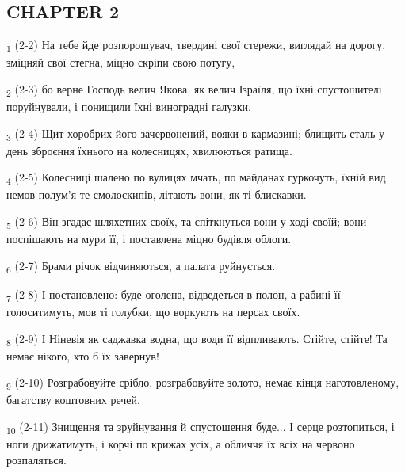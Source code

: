 \subsection{CHAPTER 2}
\begin{tcolorbox}
\textsubscript{1} (2-2) На тебе йде розпорошувач, твердині свої стережи, виглядай на дорогу, зміцняй свої стегна, міцно скріпи свою потугу,
\end{tcolorbox}
\begin{tcolorbox}
\textsubscript{2} (2-3) бо верне Господь велич Якова, як велич Ізраїля, що їхні спустошителі поруйнували, і понищили їхні виноградні галузки.
\end{tcolorbox}
\begin{tcolorbox}
\textsubscript{3} (2-4) Щит хоробрих його зачервонений, вояки в кармазині; блищить сталь у день зброєння їхнього на колесницях, хвилюються ратища.
\end{tcolorbox}
\begin{tcolorbox}
\textsubscript{4} (2-5) Колесниці шалено по вулицях мчать, по майданах гуркочуть, їхній вид немов полум'я те смолоскипів, літають вони, як ті блискавки.
\end{tcolorbox}
\begin{tcolorbox}
\textsubscript{5} (2-6) Він згадає шляхетних своїх, та спіткнуться вони у ході своїй; вони поспішають на мури її, і поставлена міцно будівля облоги.
\end{tcolorbox}
\begin{tcolorbox}
\textsubscript{6} (2-7) Брами річок відчиняються, а палата руйнується.
\end{tcolorbox}
\begin{tcolorbox}
\textsubscript{7} (2-8) І постановлено: буде оголена, відведеться в полон, а рабині її голоситимуть, мов ті голубки, що воркують на персах своїх.
\end{tcolorbox}
\begin{tcolorbox}
\textsubscript{8} (2-9) І Ніневія як саджавка водна, що води її відпливають. Стійте, стійте! Та немає нікого, хто б їх завернув!
\end{tcolorbox}
\begin{tcolorbox}
\textsubscript{9} (2-10) Розграбовуйте срібло, розграбовуйте золото, немає кінця наготовленому, багатству коштовних речей.
\end{tcolorbox}
\begin{tcolorbox}
\textsubscript{10} (2-11) Знищення та зруйнування й спустошення буде... І серце розтопиться, і ноги дрижатимуть, і корчі по крижах усіх, а обличчя їх всіх на червоно розпаляться.
\end{tcolorbox}
